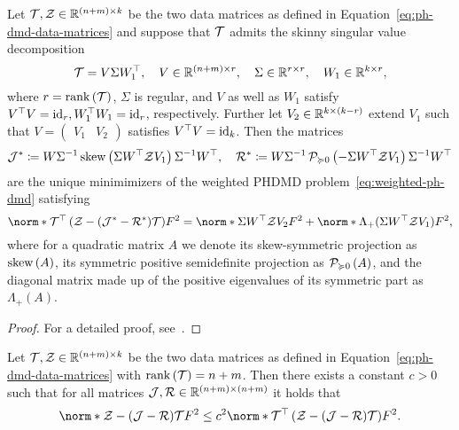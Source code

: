 \begin{lemma}\label{lem:weighted-ph-dmd-solution}
    Let $\mcl{T}, \mcl{Z} \in \bb{R}^{(n + m) \times k}$ be the two data matrices as defined in Equation~\eqref{eq:ph-dmd-data-matrices} and suppose that $\mcl{T}$ admits the skinny singular value decomposition
    \begin{equation*}
        \mcl{T} = V \Sigma W_1\trans,\quad V \in \bb{R}^{(n + m) \times r},\quad \Sigma \in \bb{R}^{r \times r},\quad W_1 \in \bb{R}^{k \times r},
    \end{equation*}
    where $r = \rank{\mcl{T}}$, $\Sigma$ is regular, and $V$ as well as $W_1$ satisfy $V\trans V = \id[r], W_1\trans W_1 = \id[r]$, respectively.
    Further let $V_2 \in \bb{R}^{k \times (k - r)}$ extend $V_1$ such that $V = \begin{pmatrix}
        V_1 & V_2
    \end{pmatrix}$ satisfies $V\trans V = \id[k]$.
    Then the matrices
    \begin{equation*}
        \mcl{J}^\ast \coloneqq W \Sigma\inv \sksym{\Sigma W\trans \mcl{Z} V_1} \Sigma\inv W\trans,\quad \mcl{R}^\ast \coloneqq W \Sigma\inv \psd{- \Sigma W\trans \mcl{Z} V_1} \Sigma\inv W\trans
    \end{equation*}
    are the unique minimimizers of the weighted \ac{PHDMD} problem~\eqref{eq:weighted-ph-dmd} satisfying
    \begin{equation*}
        \norm*{\mcl{T}\trans \left( \mcl{Z} - (\mcl{J}^\ast - \mcl{R}^\ast) \mcl{T} \right)}{F}^2 = \norm*{\Sigma W\trans \mcl{Z} V_2}{F}^2 + \norm*{\Lambda_+(\Sigma W\trans \mcl{Z} V_1)}{F}^2,
    \end{equation*}
    where for a quadratic matrix $A$ we denote its skew-symmetric projection as $\sksym{A}$, its symmetric positive semidefinite projection as $\psd{A}$, and the diagonal matrix made up of the positive eigenvalues of its symmetric part as $\Lambda_+(A)$.
\end{lemma}

\begin{proof}
    For a detailed proof, see~\cite[Proof of Theorem~3.7 and Lemma~3.10]{Morandin2023}.
\end{proof}

\begin{lemma}\label{lem:relation-ph-dmd-problems}
    Let $\mcl{T}, \mcl{Z} \in \bb{R}^{(n + m) \times k}$ be the two data matrices as defined in Equation~\eqref{eq:ph-dmd-data-matrices} with $\rank{\mcl{T}} = n + m$.
    Then there exists a constant $c > 0$ such that for all matrices $\mcl{J}, \mcl{R} \in \bb{R}^{(n + m) \times (n + m)}$ it holds that
    \begin{equation*}
        \norm*{\mcl{Z} - (\mcl{J} - \mcl{R}) \mcl{T}}{F}^2 \leq c^2 \norm*{\mcl{T}\trans \left( \mcl{Z} - (\mcl{J} - \mcl{R}) \mcl{T} \right)}{F}^2.
    \end{equation*}
\end{lemma}

